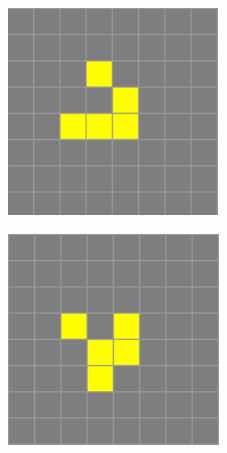 \begin{figure}[b]
    \centering
    \begin{subfigure}{0.15\textwidth}
        \includegraphics[width=\textwidth]{images/life-glider-1.png}
    \end{subfigure}
    \begin{subfigure}{0.15\textwidth}
        \includegraphics[width=\textwidth]{images/life-glider-2.png}

\end{subfigure}
\end{figure}
